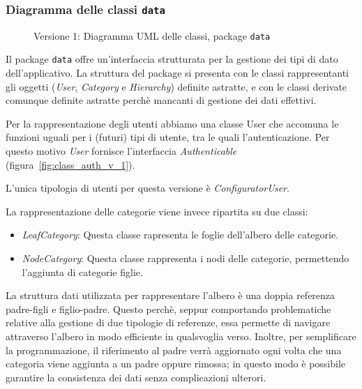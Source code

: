 \subsubsection{Diagramma delle classi \texttt{data}}
\vspace{0.5cm}
\begin{figure}[H]
    \centering
    \caption{Versione 1: Diagramma UML delle classi, package \texttt{data}}
    \label{fig:class_data_v_1}
\end{figure}

Il package \texttt{data} offre un'interfaccia strutturata per la gestione dei tipi di dato dell'applicativo.
La struttura del package si presenta con le classi rappresentanti gli oggetti (\textit{User}, \textit{Category} e \textit{Hierarchy})
definite astratte, e con le classi derivate comunque definite astratte perchè mancanti di gestione dei dati effettivi.

Per la rappresentazione degli utenti abbiamo una classe User che accomuna le funzioni uguali per i (futuri) tipi di utente, tra le quali
l'autenticazione. Per questo motivo \textit{User} fornisce l'interfaccia \textit{Authenticable} (figura~\ref{fig:class_auth_v_1}).

L'unica tipologia di utenti per questa versione è \textit{ConfiguratorUser}.

La rappresentazione delle categorie viene invece ripartita su due classi:
\begin{itemize}
    \vspace{-0.2cm}\item \textit{LeafCategory}: Questa classe rapresenta le foglie dell'albero delle categorie.
    \vspace{-0.2cm}\item \textit{NodeCategory}: Questa classe rappresenta i nodi delle categorie, permettendo l'aggiunta di categorie figlie.
\end{itemize}

La struttura dati utilizzata per rappresentare l'albero è una doppia referenza padre-figli e figlio-padre.
Questo perchè, seppur comportando problematiche relative alla gestione di due tipologie di referenze,
essa permette di navigare attraverso l'albero in modo efficiente in qualsvoglia verso.
Inoltre, per semplificare la programmazione, il riferimento al padre verrà aggiornato ogni volta che una categoria viene
aggiunta a un padre oppure rimossa; in questo modo è possibile garantire la consistenza dei dati senza complicazioni ulterori.